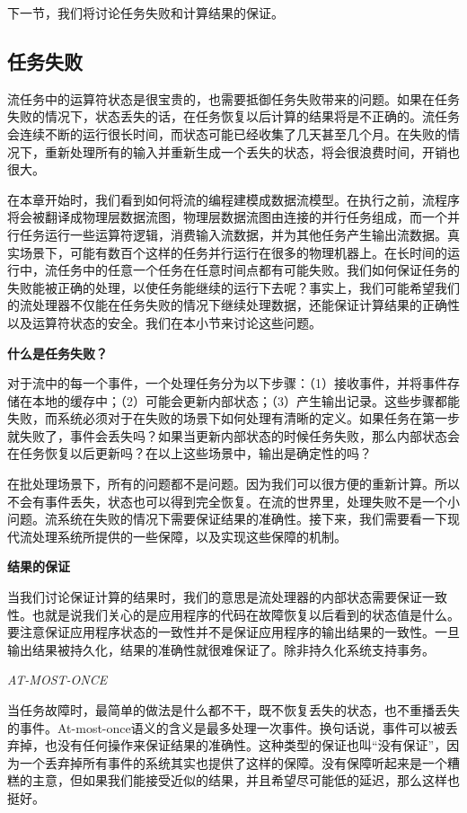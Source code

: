 \documentclass[cn,11pt,chinese]{elegantbook}
\begin{document}
下一节，我们将讨论任务失败和计算结果的保证。

\hypertarget{ux4efbux52a1ux5931ux8d25}{%
\subsection{任务失败}\label{ux4efbux52a1ux5931ux8d25}}

流任务中的运算符状态是很宝贵的，也需要抵御任务失败带来的问题。如果在任务失败的情况下，状态丢失的话，在任务恢复以后计算的结果将是不正确的。流任务会连续不断的运行很长时间，而状态可能已经收集了几天甚至几个月。在失败的情况下，重新处理所有的输入并重新生成一个丢失的状态，将会很浪费时间，开销也很大。

在本章开始时，我们看到如何将流的编程建模成数据流模型。在执行之前，流程序将会被翻译成物理层数据流图，物理层数据流图由连接的并行任务组成，而一个并行任务运行一些运算符逻辑，消费输入流数据，并为其他任务产生输出流数据。真实场景下，可能有数百个这样的任务并行运行在很多的物理机器上。在长时间的运行中，流任务中的任意一个任务在任意时间点都有可能失败。我们如何保证任务的失败能被正确的处理，以使任务能继续的运行下去呢？事实上，我们可能希望我们的流处理器不仅能在任务失败的情况下继续处理数据，还能保证计算结果的正确性以及运算符状态的安全。我们在本小节来讨论这些问题。

\textbf{什么是任务失败？}

对于流中的每一个事件，一个处理任务分为以下步骤：（1）接收事件，并将事件存储在本地的缓存中；（2）可能会更新内部状态；（3）产生输出记录。这些步骤都能失败，而系统必须对于在失败的场景下如何处理有清晰的定义。如果任务在第一步就失败了，事件会丢失吗？如果当更新内部状态的时候任务失败，那么内部状态会在任务恢复以后更新吗？在以上这些场景中，输出是确定性的吗？

在批处理场景下，所有的问题都不是问题。因为我们可以很方便的重新计算。所以不会有事件丢失，状态也可以得到完全恢复。在流的世界里，处理失败不是一个小问题。流系统在失败的情况下需要保证结果的准确性。接下来，我们需要看一下现代流处理系统所提供的一些保障，以及实现这些保障的机制。

\textbf{结果的保证}

当我们讨论保证计算的结果时，我们的意思是流处理器的内部状态需要保证一致性。也就是说我们关心的是应用程序的代码在故障恢复以后看到的状态值是什么。要注意保证应用程序状态的一致性并不是保证应用程序的输出结果的一致性。一旦输出结果被持久化，结果的准确性就很难保证了。除非持久化系统支持事务。

\emph{AT-MOST-ONCE}

当任务故障时，最简单的做法是什么都不干，既不恢复丢失的状态，也不重播丢失的事件。At-most-once语义的含义是最多处理一次事件。换句话说，事件可以被丢弃掉，也没有任何操作来保证结果的准确性。这种类型的保证也叫``没有保证''，因为一个丢弃掉所有事件的系统其实也提供了这样的保障。没有保障听起来是一个糟糕的主意，但如果我们能接受近似的结果，并且希望尽可能低的延迟，那么这样也挺好。
\end{document}
